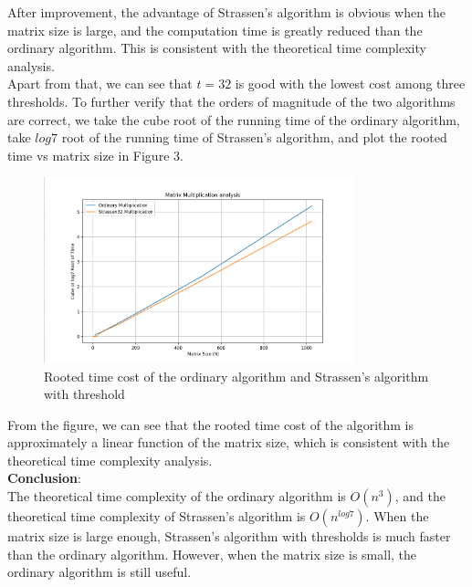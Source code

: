 \documentclass[UTF8]{ctexart}
\begin{document}
After improvement, the advantage of Strassen's algorithm is obvious when the matrix size is large, and the computation time is greatly reduced than the ordinary algorithm. This is consistent with the theoretical time complexity analysis.\\
Apart from that, we can see that $t = 32$ is good with the lowest cost among three thresholds. To further verify that the orders of magnitude of the two algorithms are correct, we take the cube root of the running time of the ordinary algorithm,
take $log7$ root of the running time of Strassen's algorithm, and plot the rooted time vs matrix size in Figure 3.\\
\begin{figure}[H]
    \centering
    \includegraphics[width=0.8\textwidth]{complexity_analysis.png}
    \caption{Rooted time cost of the ordinary algorithm and Strassen's algorithm with threshold}
\end{figure}
From the figure, we can see that the rooted time cost of the algorithm is approximately a linear function of the matrix size, which is consistent with the theoretical time complexity analysis.\\
\textbf{Conclusion}:\\
The theoretical time complexity of the ordinary algorithm is $O(n^3)$, and the theoretical time complexity of Strassen's algorithm is $O(n^{log7})$. When the matrix size is large enough, Strassen's algorithm with thresholds is much faster than the ordinary algorithm.
However, when the matrix size is small, the ordinary algorithm is still useful.\\
\end{document}
